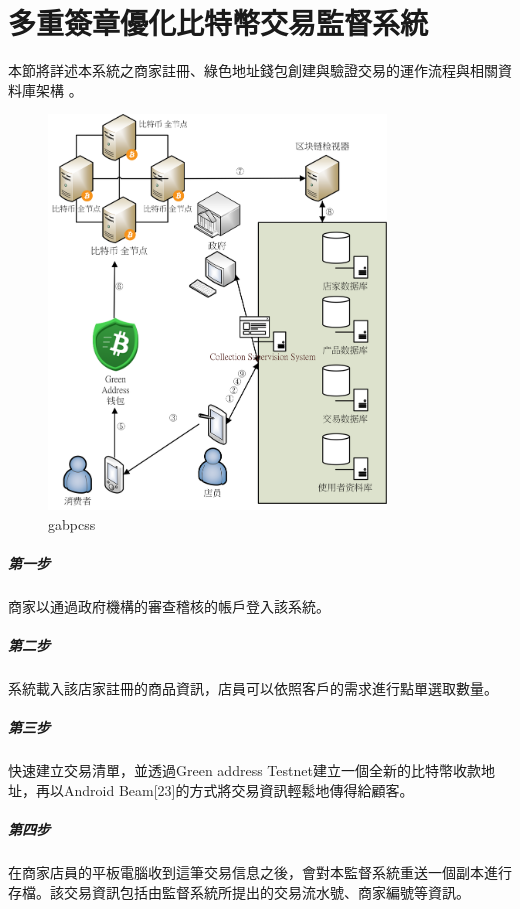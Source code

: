 
\chapter{多重簽章優化比特幣交易監督系統}
本節將詳述本系統之商家註冊、綠色地址錢包創建與驗證交易的運作流程與相關資料庫架構 。
	\begin{figure}[h]
		\centering
		\includegraphics[width = 0.8\textwidth]{gabpcss.png}
		\caption{gabpcss}\label{gabpcss}
	\end{figure}
	\paragraph{第一步}商家以通過政府機構的審查稽核的帳戶登入該系統。
	\paragraph{第二步}系統載入該店家註冊的商品資訊，店員可以依照客戶的需求進行點單選取數量。
	\paragraph{第三步}快速建立交易清單，並透過Green address Testnet建立一個全新的比特幣收款地址，再以Android Beam[23]的方式將交易資訊輕鬆地傳得給顧客。
	\paragraph{第四步}在商家店員的平板電腦收到這筆交易信息之後，會對本監督系統重送一個副本進行存檔。該交易資訊包括由監督系統所提出的交易流水號、商家編號等資訊。
